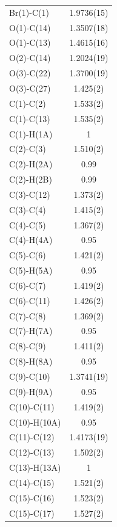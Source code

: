 \begin{center}
\tablefirsthead{%
\toprule}
\tablelasttail{\bottomrule}
{\footnotesize \singlespacing
\begin{supertabular}{p{1.5in}c}
Br(1)-C(1) &1.9736(15)\\
O(1)-C(14) &1.3507(18)\\
O(1)-C(13) &1.4615(16)\\
O(2)-C(14) &1.2024(19)\\
O(3)-C(22) &1.3700(19)\\
O(3)-C(27) &1.425(2)\\
C(1)-C(2) &1.533(2)\\
C(1)-C(13) &1.535(2)\\
C(1)-H(1A) &1\\
C(2)-C(3) &1.510(2)\\
C(2)-H(2A) &0.99\\
C(2)-H(2B) &0.99\\
C(3)-C(12) &1.373(2)\\
C(3)-C(4) &1.415(2)\\
C(4)-C(5) &1.367(2)\\
C(4)-H(4A) &0.95\\
C(5)-C(6) &1.421(2)\\
C(5)-H(5A) &0.95\\
C(6)-C(7) &1.419(2)\\
C(6)-C(11) &1.426(2)\\
C(7)-C(8) &1.369(2)\\
C(7)-H(7A) &0.95\\
C(8)-C(9) &1.411(2)\\
C(8)-H(8A) &0.95\\
C(9)-C(10) &1.3741(19)\\
C(9)-H(9A) &0.95\\
C(10)-C(11) &1.419(2)\\
C(10)-H(10A) &0.95\\
C(11)-C(12) &1.4173(19)\\
C(12)-C(13) &1.502(2)\\
C(13)-H(13A) &1\\
C(14)-C(15) &1.521(2)\\
C(15)-C(16) &1.523(2)\\
C(15)-C(17) &1.527(2)\\

\end{supertabular}}
\end{center}
